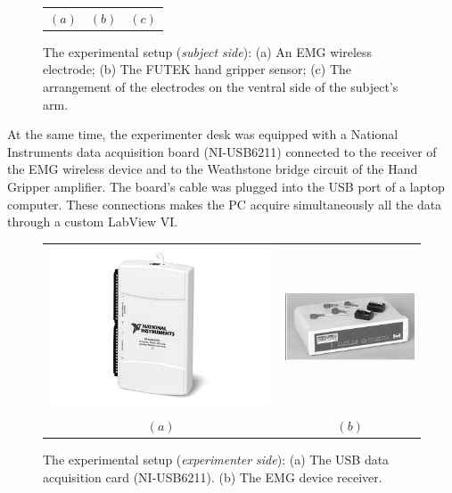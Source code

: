 \begin{figure}[!t]
\begin{tabular}{ccc}
    $(a)$ & $(b)$ & $(c)$ \\
  \end{tabular}
  \caption{The experimental setup (\textit{subject side}): (a) An EMG wireless electrode; (b) The FUTEK hand gripper sensor; (c) The arrangement of the electrodes on the ventral side of the subject's arm.}
  \label{fig:setup}
\end{figure}

At the same time, the experimenter desk was equipped with a National Instruments data acquisition board (NI-USB6211) connected to the receiver of the EMG wireless device and to the Weathstone bridge circuit of the Hand Gripper amplifier. The board's cable was plugged into the USB port of a laptop computer.
These connections makes the PC acquire simultaneously all the data through a custom LabView VI.
  
\begin{figure}[!t] \centering
  \begin{tabular}{cc}
   \includegraphics[height=0.16\textheight]{figs/NI-6211} &
    \includegraphics[height=0.16\textheight]{figs/Zero_Base} \\
  $(a)$ & $(b)$\\
  \end{tabular}
  \caption{The experimental setup (\textit{experimenter side}): (a) The USB data acquisition card (NI-USB6211). (b) The EMG device receiver.}
  \label{fig:setup}
\end{figure}

